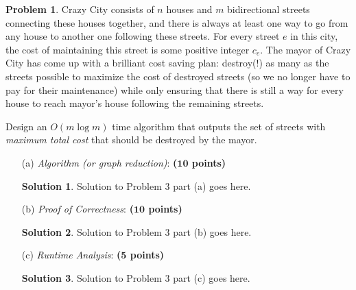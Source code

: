 \documentclass{article}
\theoremstyle{definition}
\newtheorem{problem}{Problem}
\newtheorem*{solution*}{Solution}
\newenvironment{solution}{\begin{solution*}}{{} \end{solution*}}
\newcommand{\grade}[1]{\hfill{\textbf{($\mathbf{#1}$ points)}}}
\begin{document}
\begin{problem}\label{mst}
	Crazy City consists of $n$ houses and $m$ bidirectional streets connecting these houses together, and there is always at least one way to go from any house to another one following these streets. 
	For every street $e$ in this city, the cost of maintaining this street is some positive integer $c_e$. 
	The mayor of Crazy City has come up with a brilliant cost saving plan: destroy(!) as many as the streets possible to maximize the cost of destroyed streets (so we no longer have to pay for their maintenance) while only ensuring that there is still a way for every house to reach mayor's house following the remaining streets. 
	
	Design an $O(m\log{m})$ time algorithm that outputs the set of streets with \emph{maximum total cost} that should be destroyed by the mayor. 

\begin{enumerate}
	\item[(a)] \emph{Algorithm (or graph reduction)}: \grade{10} 
	
	
\begin{solution}
	Solution to Problem 3 part (a) goes here. 
\end{solution}

	\newpage
	\item[(b)] \emph{Proof of Correctness}: \grade{10} 
	
\begin{solution}
	Solution to Problem 3 part (b) goes here. 
\end{solution}


\bigskip


	\item[(c)] \emph{Runtime Analysis}: \grade{5} 
	
	
\begin{solution}
	Solution to Problem 3 part (c) goes here. 
\end{solution}

\end{enumerate}
	
	
\end{problem}
\newpage
\end{document}
